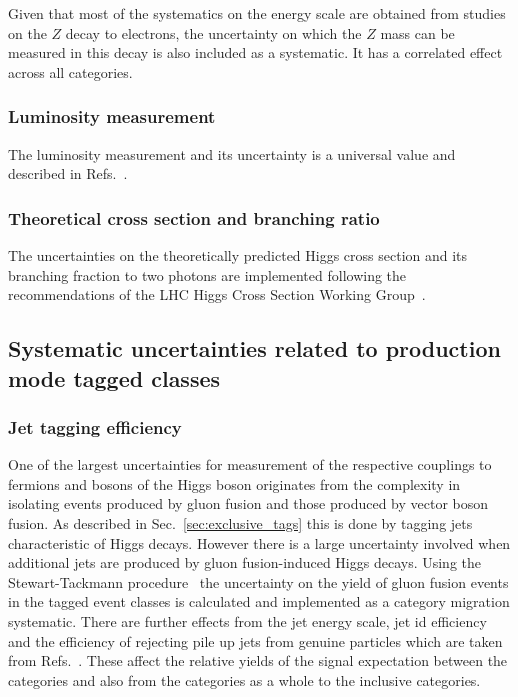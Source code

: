 Given that most of the systematics on the energy scale are obtained from studies on the $Z$ decay to electrons, the uncertainty on which the $Z$ mass can be measured in this decay is also included as a systematic. It has a correlated effect across all categories.

\subsubsection{Luminosity measurement}

The luminosity measurement and its uncertainty is a \CMS universal value and described in Refs.~\cite{lumi1,lumi2}.

\subsubsection{Theoretical cross section and branching ratio}

The uncertainties on the theoretically predicted \SM Higgs cross section and its branching fraction to two photons are implemented following the recommendations of the LHC Higgs Cross Section Working Group~\cite{LHCHiggsCrossSectionWorkingGroup3}. 

\subsection{Systematic uncertainties related to production mode tagged classes}

\subsubsection{Jet tagging efficiency}

One of the largest uncertainties for measurement of the respective couplings to fermions and bosons of the Higgs boson originates from the complexity in isolating events produced by gluon fusion and those produced by vector boson fusion. As described in Sec.~\ref{sec:exclusive_tags} this is done by tagging jets characteristic of \VBF Higgs decays. However there is a large uncertainty involved when additional jets are produced by gluon fusion-induced Higgs decays. Using the Stewart-Tackmann procedure~\cite{vbf_syst} the uncertainty on the yield of gluon fusion events in the \VBF tagged event classes is calculated and implemented as a category migration systematic. There are further effects from the jet energy scale, jet id efficiency and the efficiency of rejecting pile up jets from genuine particles which are taken from Refs.~\cite{jet_energy_corrections,jet_energy_corrs2}. These affect the relative yields of the signal expectation between the \VBF categories and also from the \VBF categories as a whole to the inclusive categories.  

